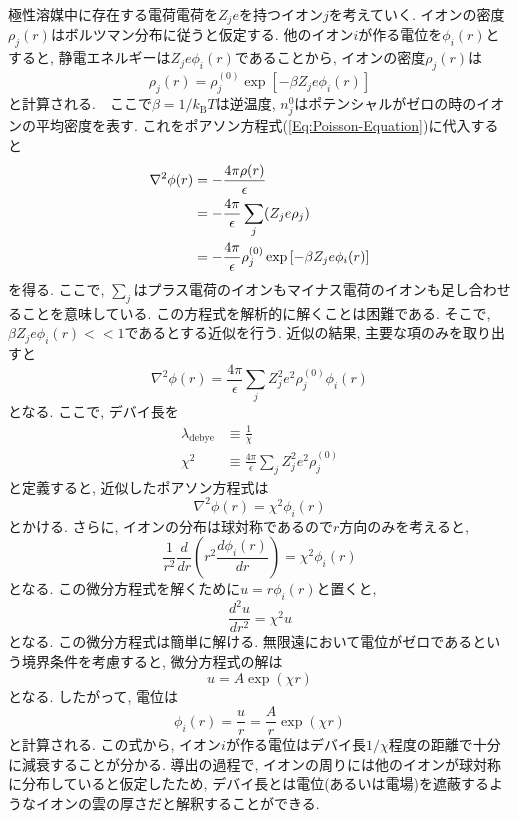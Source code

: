 極性溶媒中に存在する電荷電荷を$Z_{j} e$を持つイオン$j$を考えていく.
イオンの密度$\rho_{j}(r)$はボルツマン分布に従うと仮定する. 
他のイオン$i$が作る電位を$\phi_{i}(r)$とすると, 静電エネルギーは$Z_{j}e \phi_{i}(r)$であることから, イオンの密度$\rho_{j}(r)$は
\begin{equation}
    \rho_{j}(r) =
    \rho_{j}^{(0)} \exp\left[-\beta Z_{j}e \phi_{i}(r)\right]
\end{equation}
と計算される.　ここで$\beta = 1/k_{\mathrm{B}}T$は逆温度, $n_{j}^{0}$はポテンシャルがゼロの時のイオンの平均密度を表す. 
これをポアソン方程式(\ref{Eq:Poisson-Equation})に代入すると
\begin{align}
    \nabla^{2} \phi(r)
    &=
    - \frac{4\pi\rho(r)}{\epsilon}
    \notag \\
    &=
    - \frac{4\pi}{\epsilon} \sum_{j}(Z_{j} e \rho_{j})
    \notag \\
    &=
    - \frac{4\pi}{\epsilon}
    \rho_{j}^{(0)} \exp\left[-\beta Z_{j}e \phi_{i}(r)\right]
\end{align}
を得る. ここで, $\sum_{j}$はプラス電荷のイオンもマイナス電荷のイオンも足し合わせることを意味している. この方程式を解析的に解くことは困難である. そこで, $\beta Z_{j} e \phi_{i}(r) << 1$であるとする近似を行う. 近似の結果, 主要な項のみを取り出すと
\begin{equation}
    \nabla^{2} \phi(r)
    =
    \frac{4\pi}{\epsilon}
    \sum_{j} Z_{j}^{2} e^{2} \rho_{j}^{(0)} \phi_{i}(r)
\end{equation}
となる. ここで, デバイ長を
\begin{align}
    \lambda_{\mathrm{debye}} &\equiv \frac{1}{\chi} 
    \\
    \chi^{2} &\equiv 
    \frac{4\pi}{\epsilon}
    \sum_{j} Z_{j}^{2} e^{2} \rho_{j}^{(0)}
\end{align}
と定義すると, 近似したポアソン方程式は
\begin{equation}
    \nabla^{2} \phi(r) = \chi^{2} \phi_{i}(r)
\end{equation}
とかける. さらに, イオンの分布は球対称であるので$r$方向のみを考えると,
\begin{equation}
    \frac{1}{r^{2}} \frac{d}{dr}
    \left(
        r^{2}
        \frac{d\phi_{i}(r)}{dr}
    \right)
    =
    \chi^{2} \phi_{i}(r)
\end{equation}
となる. この微分方程式を解くために$u = r \phi_{i}(r)$と置くと,
\begin{equation}
    \frac{d^{2} u}{dr^{2}} = \chi^{2} u
\end{equation}
となる. この微分方程式は簡単に解ける.
無限遠において電位がゼロであるという境界条件を考慮すると, 微分方程式の解は
\begin{equation}
    u = A \exp(\chi r)
\end{equation}
となる. したがって, 電位は
\begin{equation}
    \phi_{i}(r) = \frac{u}{r} = \frac{A}{r} \exp(\chi r)
\end{equation}
と計算される. この式から, イオン$i$が作る電位はデバイ長$1/\chi$程度の距離で十分に減衰することが分かる. 導出の過程で, イオンの周りには他のイオンが球対称に分布していると仮定したため, デバイ長とは電位(あるいは電場)を遮蔽するようなイオンの雲の厚さだと解釈することができる.

